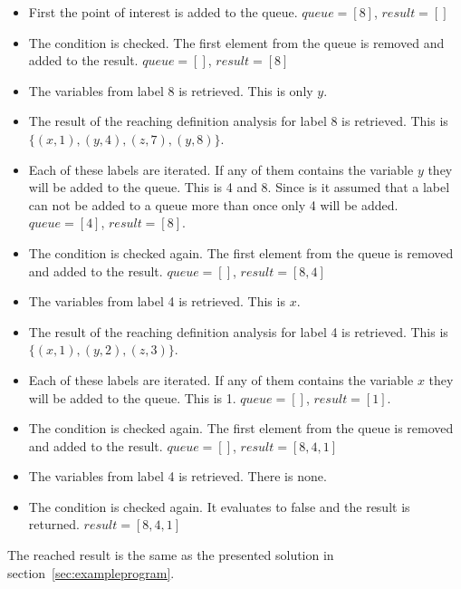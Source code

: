 \begin{itemize}
	\item First the point of interest is added to the queue. $queue=[8]$, $result=[]$
	\item The condition is checked. The first element from the queue is removed and added to the result. $queue=[]$, $result=[8]$
	\item The variables from label 8 is retrieved. This is only $y$.
	\item The result of the reaching definition analysis for label 8 is retrieved. This is $\{(x, 1), (y, 4), (z, 7), (y, 8)\}$.
	\item Each of these labels are iterated. If any of them contains the variable $y$ they will be added to the queue. This is 4 and 8. Since is it assumed that a label can not be added to a queue more than once only 4 will be added. $queue=[4]$, $result=[8]$.
	\item The condition is checked again. The first element from the queue is removed and added to the result. $queue=[]$, $result=[8,4]$
	\item The variables from label 4 is retrieved. This is $x$.
	\item The result of the reaching definition analysis for label 4 is retrieved. This is $\{(x, 1), (y, 2), (z, 3)\}$.
	\item Each of these labels are iterated. If any of them contains the variable $x$ they will be added to the queue. This is 1. $queue=[]$, $result=[1]$.
	\item The condition is checked again. The first element from the queue is removed and added to the result. $queue=[]$, $result=[8,4,1]$
	\item The variables from label 4 is retrieved. There is none.
	\item The condition is checked again. It evaluates to false and the result is returned. $result=[8,4,1]$
\end{itemize}
The reached result is the same as the presented solution in section~\ref{sec:exampleprogram}.